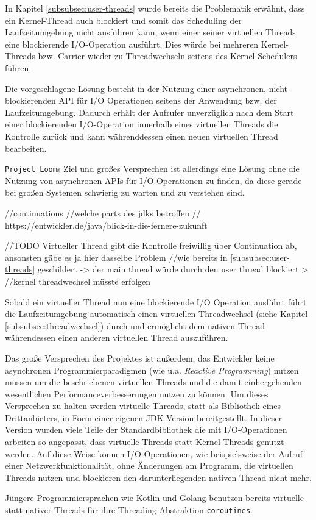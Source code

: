 In Kapitel \ref{subsubsec:user-threads} wurde bereits die Problematik erwähnt, dass ein Kernel-Thread auch blockiert und somit
das Scheduling der Laufzeitumgebung nicht ausführen kann, wenn einer seiner virtuellen Threads eine blockierende I/O-Operation ausführt.
Dies würde bei mehreren Kernel-Threads bzw. Carrier wieder zu Threadwechseln seitens des Kernel-Schedulers führen.

Die vorgeschlagene Lösung besteht in der Nutzung einer asynchronen, nicht-blockierenden API für I/O Operationen seitens
der Anwendung bzw. der Laufzeitumgebung. Dadurch erhält der Aufrufer unverzüglich nach dem Start einer blockierenden I/O-Operation
innerhalb eines virtuellen Threads die Kontrolle zurück und kann währenddessen einen neuen virtuellen Thread bearbeiten.

\verb|Project Loom|s Ziel und großes Versprechen ist allerdings eine Lösung ohne die Nutzung von asynchronen APIs für I/O-Operationen
zu finden, da diese gerade bei großen Systemen schwierig zu warten und zu verstehen sind.

//continuations
//welche parts des jdks betroffen
//
https://entwickler.de/java/blick-in-die-fernere-zukunft



//TODO Virtueller Thread gibt die Kontrolle freiwillig über Continuation ab, ansonsten gäbe es ja hier dasselbe Problem
//wie bereits in \ref{subsubsec:user-threads} geschildert -> der main thread würde durch den user thread blockiert >
//kernel threadwechsel müsste erfolgen

Sobald ein virtueller Thread nun eine blockierende I/O Operation ausführt führt die Laufzeitumgebung automatisch einen
virtuellen Threadwechsel (siehe Kapitel \ref{subsubsec:threadwechsel}) durch und ermöglicht dem nativen Thread währendessen einen
anderen virtuellen Thread auszuführen.

Das große Versprechen des Projektes ist außerdem, das Entwickler keine asynchronen Programmierparadigmen (wie u.a. \textit{Reactive Programming})
nutzen müssen um die beschriebenen virtuellen Threads und die damit einhergehenden wesentlichen Performanceverbesserungen nutzen zu können.
Um dieses Versprechen zu halten werden virtuelle Threads, statt als Bibliothek eines Drittanbieters, in Form einer eigenen JDK Version bereitgestellt.
In dieser Version wurden viele Teile der Standardbibliothek die mit I/O-Operationen arbeiten so angepasst, dass virtuelle Threads statt Kernel-Threads
genutzt werden. Auf diese Weise können I/O-Operationen, wie beispielsweise der Aufruf einer Netzwerkfunktionalität, ohne Änderungen am Programm,
die virtuellen Threads nutzen und blockieren den darunterliegenden nativen Thread nicht mehr.

Jüngere Programmiersprachen wie Kotlin und Golang benutzen bereits virtuelle statt nativer Threads
für ihre Threading-Abstraktion \verb|coroutines|. \parencite{KotlinCoroutines, GoCoroutines}